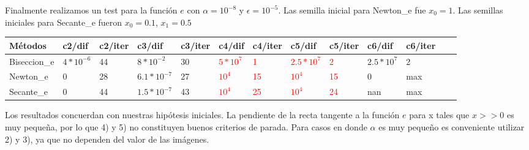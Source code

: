 Finalmente realizamos un test para la función $e$ con $\alpha = 10^{-8}$ y $\epsilon = 10^{-5}$. Las semilla inicial para Newton\_e fue $x_{0}=1$. Las semillas iniciales para Secante\_e fueron $x_{0} = 0.1$, 
$x_{1} = 0.5$

\begin{center}
    \small{
    \begin{tabular}{| l | l | l | l | l | l | l | l | l | l | l | l | l |}
    \hline
    Métodos & c2/dif & c2/iter & c3/dif & c3/iter & c4/dif & c4/iter & c5/dif & c5/iter & c6/dif & c6/iter \\ \hline
    Biseccion\_e & $4*10^{-6}$ & 44 & $8*10^{-2}$ & 30 & \textcolor{red}{$5*10^{7}$} & \textcolor{red}{1} & \textcolor{red}{$2.5*10^{7}$} & \textcolor{red}{2} & {$2.5*10^{7}$} & 2  \\ \hline
    Newton\_e & 0 & 28 & $6.1*10^{-7}$ & 27 & \textcolor{red}{$10^{4}$} & \textcolor{red}{15} & \textcolor{red}{$10^{4}$} & \textcolor{red}{15} & 0 & max \\ \hline
    Secante\_e & 0 & 44 & $1.5*10^{-7}$ & 43 & \textcolor{red}{$10^{4}$} & \textcolor{red}{25} & \textcolor{red}{$10^{4}$} & \textcolor{red}{24} & nan & max   \\ \hline
    \end{tabular}
    }
\end{center}

Los resultados concuerdan con nuestras hipótesis iniciales. La pendiente de la recta tangente a la función $e$ para x tales que $x >> 0$ es muy peque\~na, por lo que 4) y 5) no constituyen buenos
criterios de parada. Para casos en donde $\alpha$ es muy peque\~no es conveniente utilizar 2) y 3), ya que no dependen del valor de las imágenes.
